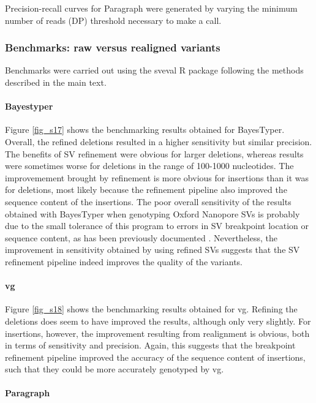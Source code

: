 \documentclass[12pt]{article}
\begin{document}
Precision-recall curves for Paragraph were generated by varying the minimum number of reads (DP) threshold necessary to make a call.

\subsubsection{Benchmarks: raw versus realigned variants}

Benchmarks were carried out using the sveval R package \citep[][\url{https://github.com/jmonlong/sveval}]{vg} following the methods described in the main text.

\paragraph{Bayestyper}

Figure \ref{fig_s17} shows the benchmarking results obtained for BayesTyper.
Overall, the refined deletions resulted in a higher sensitivity but similar precision. 
The benefits of SV refinement were obvious for larger deletions, whereas results were sometimes worse for deletions in the range of 100-1000 nucleotides.
The improvemement brought by refinement is more obvious for insertions than it was for deletions, most likely because the refinement pipeline also improved the sequence content of the insertions.
The poor overall sensitivity of the results obtained with BayesTyper when genotyping Oxford Nanopore SVs is probably due to the small tolerance of this program to errors in SV breakpoint location or sequence content, as has been previously documented \citep{vg}.
Nevertheless, the improvement in sensitivity obtained by using refined SVs suggests that the SV refinement pipeline indeed improves the quality of the variants.

\paragraph{vg}

Figure \ref{fig_s18} shows the benchmarking results obtained for vg.
Refining the deletions does seem to have improved the results, although only very slightly.
For insertions, however, the improvement resulting from realignment is obvious, both in terms of sensitivity and precision.
Again, this suggests that the breakpoint refinement pipeline improved the accuracy of the sequence content of insertions, such that they could be more accurately genotyped by vg.

\paragraph{Paragraph}
\end{document}
